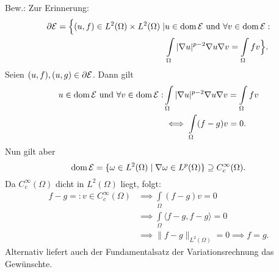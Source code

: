 \begin{beispiel}
Bew.: Zur Erinnerung:
\begin{align*}
	\partial\mathcal{E} = \Big\{(u,f) \in L^2(\Omega)\times L^2(\Omega) \mid & u \in \operatorname{dom} \mathcal{E} \text{ und } \forall v \in \operatorname{dom}\mathcal{E} : \\
	& \int\limits_{\Omega} |\nabla u|^{p-2}\nabla u \nabla v = \int\limits_{\Omega} fv\Big\}.
\end{align*}
Seien $(u,f),(u,g) \in \partial\mathcal{E}$. Dann gilt 
\begin{align*}
	u \in \operatorname{dom} \mathcal{E} \text{ und } \forall v \in \operatorname{dom}\mathcal{E} : &\int\limits_{\Omega} |\nabla u|^{p-2}\nabla u \nabla v = \int\limits_{\Omega} fv\\
	& \iff \int\limits_{\Omega}(f-g)v = 0.
\end{align*}
Nun gilt aber
$$ \operatorname{dom}\mathcal{E} = \{\omega \in L^2(\Omega) \mid \nabla \omega \in L^p(\Omega)\} \supseteq C_c^\infty(\Omega).$$
Da $C_c^\infty(\Omega)$ dicht in $L^2(\Omega)$ liegt, folgt: 
\begin{align*}
	f-g =: v \in C_c^\infty(\Omega) & \implies \int\limits_\Omega(f-g)v = 0\\
	& \implies \int\limits_\Omega\langle f-g, f-g \rangle = 0\\
	& \implies \| f-g \|_{L^2(\Omega)} = 0 \implies f = g.
\end{align*}
Alternativ liefert auch der Fundamentalsatz der Variationsrechnung das Gewünschte.
\end{beispiel}


